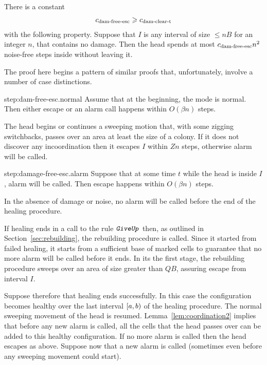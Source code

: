 \documentclass[12pt]{memoir}
\renewcommand{\le}{\leq}
\newcommand{\rul}[1]{\ensuremath{\texttt{\slshape #1\/}}}
\def\B{B}
\newcommand{\Z}{Z}
\newcommand{\GiveUp}{\rul{GiveUp}}
\newcommand{\cns}[1]{c_{\textrm{\upshape #1}}}
\newcommand{\cDamFreeEsc}{\cns{dam-free-esc}}
\newcommand{\cDamClearT}{\cns{dam-clear-t}}
\begin{document}
\begin{lemma}\label{lem:dam-free-esc}
 There is a constant
\begin{align}\label{eq:cns.dam-free-esc}
  \cDamFreeEsc \ge\cDamClearT 
 \end{align}
with the following property.
Suppose that \( I \) is any interval of size \( \le n\B \) for an integer \( n \),
that contains no damage.
Then the head spends at most \( \cDamFreeEsc  n^{2} \) noise-free steps inside without leaving it.
\end{lemma}
\begin{Proof}
  The proof here begins a pattern of similar proofs that, unfortunately, involve a
  number of case distinctions.
\begin{step+}{step:dam-free-esc.normal}
Assume that at the beginning, the mode is normal.
Then either escape or an alarm call happens within \( O(\beta n) \) steps.
\end{step+}
\begin{pproof}
The head begins or continues a sweeping motion that, with some zigging 
switchbacks, passes over an area at least the size of a colony.
If it does not discover any incoordination then it escapes \( I \)
within \( \Z n \) steps, otherwise alarm will be called.
\end{pproof} %
\begin{step+}{step:damage-free-esc.alarm}
Suppose that at some time \( t \) while the head is inside \( I \), alarm will be called.
Then escape happens within \( O(\beta n) \) steps.
\end{step+}
\begin{pproof}
In the absence of damage or noise, no alarm will be called before the end of 
the healing procedure.

If healing ends in a call to the rule \( \GiveUp \) then, as outlined in 
Section~\ref{sec:rebuilding}, the rebuilding procedure is called.
Since it started from failed healing, it starts from a sufficient base of
marked cells to guarantee that no more alarm will be called before it ends.
In its the first stage, the rebuilding procedure sweeps over an area of size greater
than \( Q\B \), assuring escape from interval \( I \).

Suppose therefore that healing ends successfully.
In this case the configuration becomes healthy
over the last interval \( [a,b) \) of the healing procedure.  
The normal sweeping movement of the head is resumed.
Lemma~\ref{lem:coordination2} implies that 
before any new alarm is called, all the cells that the
head passes over can be added to this healthy configuration.
If no more alarm is called then the head escapes as above.
Suppose now that a new alarm is called (sometimes
even before any sweeping movement could start).


\end{pproof}
\end{Proof}
\end{document}
